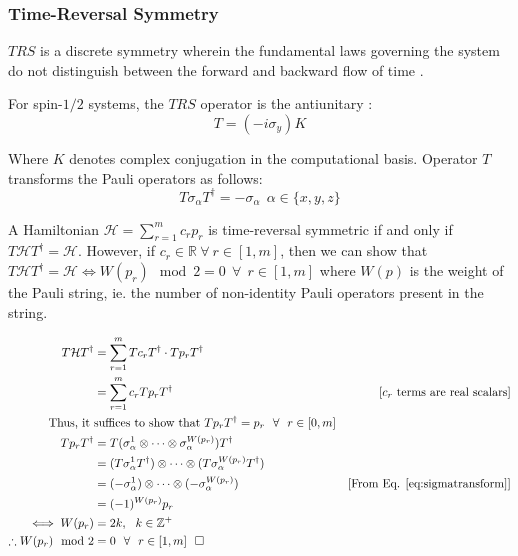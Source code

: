 \documentclass{article}
\newcommand{\qed}{\hfill\square}
\newcommand{\ham}{\mathcal{H}}
\begin{document}
\subsubsection{Time-Reversal Symmetry}

$TRS$ is a discrete symmetry wherein the fundamental laws governing the system do not distinguish between the forward and backward flow of time \cite{Sakurai_modern_qm2010}. 

For spin-$1/2$ systems, the $TRS$ operator is the antiunitary \cite{Sakurai_modern_qm2010}:
\begin{equation}
    T = (-i\sigma_y)K
\end{equation}

Where $K$ denotes complex conjugation in the computational basis. Operator $T$ transforms the Pauli operators as follows:
\begin{equation}\label{eq:sigmatransform}
    T\sigma_\alpha T^\dagger = -\sigma_\alpha ~~\alpha \in \{x, y,z\}
\end{equation}

A Hamiltonian $\ham = \sum_{r=1}^m c_rp_r$ is time-reversal symmetric if and only if $T\ham T^\dagger = \ham$. However, if $c_r \in \mathbb{R} ~\forall~ r \in [1, m]$, then we can show that $T\ham T^\dagger = \ham \iff W(p_r) \mod 2=0 ~~\forall~~r \in [1, m]$ where $W(p)$ is the weight of the Pauli string, ie. the number of non-identity Pauli operators present in the string.

\begin{align*}
    T\ham T^\dagger &= \sum_{r=1}^m Tc_rT^\dagger \cdot Tp_rT^\dagger\\
    &= \sum_{r=1}^mc_r Tp_rT^\dagger &\text{[$c_r$ terms are real scalars]}\\
    \text{Thus, it } & \text{suffices to show that } T p_r T^\dagger = p_r ~~\forall~~ r \in [0, m]\\
    Tp_rT^\dagger &= T(\sigma_{\alpha}^1 \otimes \dots\otimes \sigma_{\alpha}^{W(p_r)})T^\dagger\\
    &= (T\sigma_{\alpha}^{1}T^\dagger)\otimes\dots\otimes (T\sigma_{\alpha}^{W(p_r)}T^\dagger)\\
    &= (-\sigma_{\alpha}^{1})\otimes\dots\otimes (-\sigma_{\alpha}^{W(p_r)}) &\text{[From Eq. \eqref{eq:sigmatransform}]}\\
    &= (-1)^{W(p_r)}p_r\\
    \iff W(p_r) &= 2k,~~k \in \mathbb{Z^+}\\
    \therefore W(p_r) \mod 2&= 0 ~~\forall~~ r\in [1, m]~~\qed
\end{align*}
\end{document}
